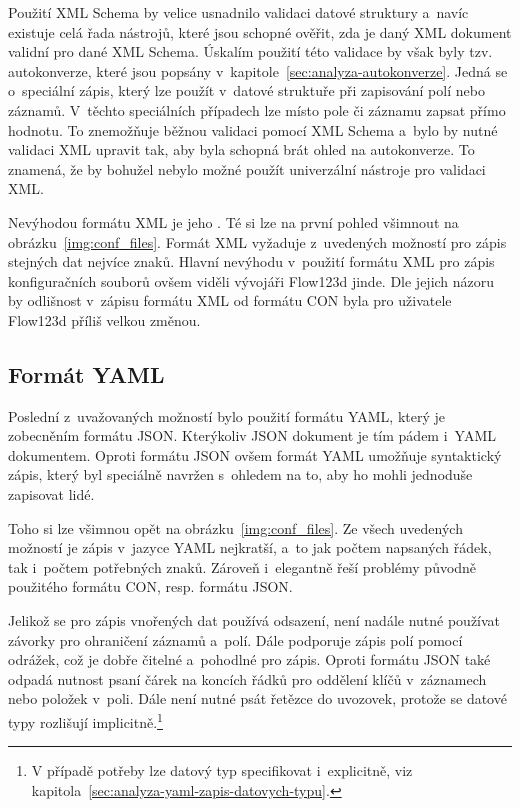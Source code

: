 \documentclass[FM,bw,DP]{tulthesis}
\begin{document}
Použití \gls{XML} Schema by velice usnadnilo validaci datové struktury a~navíc existuje celá řada nástrojů, které jsou schopné ověřit, zda je daný \gls{XML} dokument validní pro dané \gls{XML} Schema. Úskalím použití této validace by však byly tzv. autokonverze, které jsou popsány v~kapitole~\ref{sec:analyza-autokonverze}. Jedná se o~speciální zápis, který lze použít v~datové struktuře při zapisování polí nebo záznamů. V~těchto speciálních případech lze místo pole či záznamu zapsat přímo hodnotu. To znemožňuje běžnou validaci pomocí XML Schema a~bylo by nutné validaci \gls{XML} upravit tak, aby byla schopná brát ohled na autokonverze. To znamená, že by bohužel nebylo možné použít univerzální nástroje pro validaci \gls{XML}.

Nevýhodou formátu \gls{XML} je jeho . Té si lze na první pohled všimnout na obrázku~\ref{img:conf_files}. Formát \gls{XML} vyžaduje z~uvedených možností pro zápis stejných dat nejvíce znaků. Hlavní nevýhodu v~použití formátu \gls{XML} pro zápis konfiguračních souborů ovšem viděli vývojáři Flow123d jinde. Dle jejich názoru by odlišnost v~zápisu formátu \gls{XML} od formátu \gls{CON} byla pro uživatele Flow123d příliš velkou změnou.

\subsection{Formát YAML}
\label{sec:problematika-format-yaml}

Poslední z~uvažovaných možností bylo použití formátu \gls{YAML}, který je zobecněním formátu \gls{JSON}. Kterýkoliv \gls{JSON} dokument je tím pádem i~\gls{YAML} dokumentem. Oproti formátu \gls{JSON} ovšem formát \gls{YAML} umožňuje syntaktický zápis, který byl speciálně navržen s~ohledem na to, aby ho mohli jednoduše zapisovat lidé.

Toho si lze všimnou opět na obrázku~\ref{img:conf_files}. Ze všech uvedených možností je zápis v~jazyce YAML nejkratší, a~to jak počtem napsaných řádek, tak i~počtem potřebných znaků. Zároveň i~elegantně řeší problémy původně použitého formátu \gls{CON}, resp. formátu \gls{JSON}.

Jelikož se pro zápis vnořených dat používá odsazení, není nadále nutné používat závorky pro ohraničení záznamů a~polí. Dále podporuje zápis polí pomocí odrážek, což je dobře čitelné a~pohodlné pro zápis. Oproti formátu \gls{JSON} také odpadá nutnost psaní čárek na koncích řádků pro oddělení klíčů v~záznamech nebo položek v~poli. Dále není nutné psát řetězce do uvozovek, protože se datové typy rozlišují implicitně.\footnote{V případě potřeby lze datový typ specifikovat i~explicitně, viz kapitola~\ref{sec:analyza-yaml-zapis-datovych-typu}.}
\end{document}
